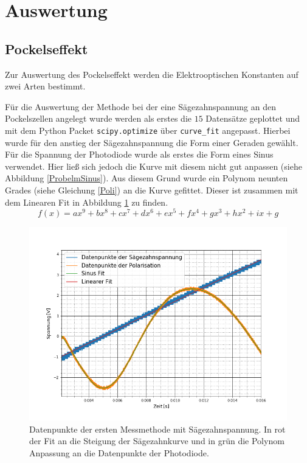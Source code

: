 \section{Auswertung}
\subsection{Pockelseffekt}
Zur Auswertung des Pockelseffekt werden die Elektrooptischen Konstanten auf zwei Arten bestimmt. \par
Für die Auswertung der Methode bei der eine Sägezahnspannung an den Pockelszellen angelegt wurde werden als erstes die $15$ Datensätze geplottet und mit dem Python Packet \verb|scipy.optimize| über \verb|curve_fit| angepasst. Hierbei wurde für den anstieg der Sägezahnspannung die Form einer Geraden gewählt. Für die Spannung der Photodiode wurde als erstes die Form eines Sinus verwendet. Hier ließ sich jedoch die Kurve mit diesem nicht gut anpassen (siehe Abbildung \ref{ProbelmSinus}). Aus diesem Grund wurde ein Polynom neunten Grades (siehe Gleichung \ref{Poli}) an die Kurve gefittet. Dieser ist zusammen mit dem Linearen Fit in Abbildung \ref{PoliBild} zu finden.
\begin{equation}
	f(x)=ax^9+bx^8+c x^7+d x^6+ex^5+f x^4+gx^3+hx^2+ix+g
	\label{Poli}
\end{equation}
\begin{figure}[ht]
	\includegraphics[scale=0.5]{Bild/V1_1}
	\centering
	\caption[Plot zu Versuchsteil 1]{\small Datenpunkte der ersten Messmethode mit Sägezahnspannung. In rot der Fit an die Steigung der Sägezahnkurve und in grün die Polynom Anpassung an die Datenpunkte der Photodiode.}
	\label{PoliBild}
\end{figure}
